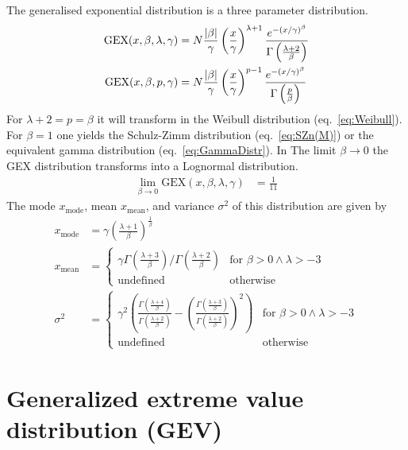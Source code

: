 The generalised exponential distribution is a three parameter distribution.
\begin{align}
\text{GEX} (x,\beta,\lambda,\gamma) &= N \frac{\abs{\beta}}{\gamma} \left(\frac{x}{\gamma}\right)^{\lambda+1} 
\frac{e^{-(x/\gamma)^\beta}}{\Gamma\left( \frac{\lambda+2}{\beta} \right)} \\
\text{GEX}(x,\beta,p,\gamma)     &= N
\frac{\abs{\beta}}{\gamma}\left(\frac{x}{\gamma}\right)^{p-1}
\frac{e^{-(x/\gamma)^{\beta}}}{\Gamma  \left( {\frac{p}{\beta}} \right)}
\end{align}
For $\lambda+2=p=\beta$ it will transform in the Weibull distribution (eq.\ \ref{eq:Weibull}). For $\beta=1$ one yields the Schulz-Zimm distribution (eq.\ \ref{eq:SZn(M)}) or the equivalent gamma distribution (eq.\ \ref{eq:GammaDistr}). In The limit $\beta \rightarrow 0$ the GEX distribution transforms into a Lognormal distribution.
\begin{align}
\lim_{\beta\rightarrow 0} \text{GEX} (x,\beta,\lambda,\gamma) &= \frac{1}{11}
\end{align}
The mode $x_\mathrm{mode}$, mean $x_\mathrm{mean}$, and variance $\sigma^2$ of this distribution are given by
\begin{align}
x_\mathrm{mode} &= \gamma \left( \frac{\lambda+1}{\beta}\right)^\frac{1}{\beta} \\
x_\mathrm{mean} &=
\begin{cases}
\gamma \Gamma\left(\frac{\lambda+3}{\beta}\right)/\Gamma\left(\frac{\lambda+2}{\beta}\right) & \mbox{for } \beta > 0 \wedge \lambda > -3 \\
\mbox{undefined} & \mbox{otherwise}
\end{cases} \\
\sigma^2 &=
\begin{cases}
\gamma^2 \left(
\frac{\Gamma\left(\frac{\lambda+4}{\beta}\right)}{\Gamma\left(\frac{\lambda+2}{\beta}\right)} -
\left(\frac{\Gamma\left(\frac{\lambda+3}{\beta}\right)}{\Gamma\left(\frac{\lambda+2}{\beta}\right)}\right)^2
\right)& \mbox{for } \beta > 0 \wedge \lambda > -3 \\
\mbox{undefined} & \mbox{otherwise}
\end{cases}
\end{align}

\clearpage
\section{Generalized extreme value distribution (GEV)}

